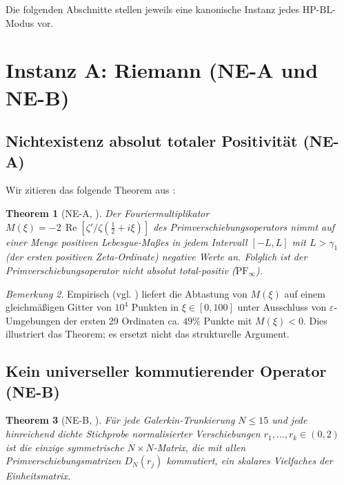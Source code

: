 \documentclass[11pt]{article}
\newtheorem{theorem}{Theorem}[section]
\theoremstyle{definition}
\theoremstyle{remark}
\newtheorem{remark}[theorem]{Bemerkung}
\newcommand{\HBL}{\mathrm{HP\text{-}BL}}
\renewcommand{\Re}{\operatorname{Re}}
\newcommand{\halfline}{\tfrac{1}{2}}
\begin{document}
Die folgenden Abschnitte stellen jeweils eine kanonische Instanz jedes
$\HBL$-Modus vor.

\section{Instanz A: Riemann (NE-A und NE-B)}
\label{sec:riemann}

\subsection{Nichtexistenz absolut totaler Positivität (NE-A)}
\label{sec:ne-a}

Wir zitieren das folgende Theorem aus \cite{Geiger2026RHII}:

\begin{theorem}[NE-A, {\cite[Thm.~NE-A]{Geiger2026RHII}}]\label{thm:NE-A}
Der Fouriermultiplikator
$M(\xi) = -2\,\Re[\zeta'/\zeta(\halfline + i\xi)]$
des Primverschiebungsoperators nimmt auf einer Menge positiven Lebesgue-Maßes
in jedem Intervall $[-L, L]$ mit $L > \gamma_1$ (der ersten positiven Zeta-Ordinate)
negative Werte an. Folglich ist der Primverschiebungsoperator
nicht absolut total-positiv ($\mathrm{PF}_\infty$).
\end{theorem}

\begin{remark}\label{rem:ne-a-empirical}
Empirisch (vgl. \cite[\S4.2]{Geiger2026RHII}) liefert die Abtastung von $M(\xi)$
auf einem gleichmäßigen Gitter von $10^4$ Punkten in $\xi \in [0,100]$ unter Ausschluss
von $\varepsilon$-Umgebungen der ersten 29 Ordinaten ca. $49\%$ Punkte mit $M(\xi) < 0$.
Dies illustriert das Theorem; es ersetzt nicht das strukturelle Argument.
\end{remark}

\subsection{Kein universeller kommutierender Operator (NE-B)}
\label{sec:ne-b}

\begin{theorem}[NE-B, {\cite[Thm.~NE-B]{Geiger2026RHII}}]\label{thm:NE-B}
Für jede Galerkin-Trunkierung $N \leq 15$ und jede hinreichend
dichte Stichprobe normalisierter Verschiebungen $r_1, \ldots, r_k \in (0,2)$
ist die einzige symmetrische $N \times N$-Matrix, die mit allen
Primverschiebungsmatrizen $D_N(r_j)$ kommutiert, ein skalares Vielfaches
der Einheitsmatrix.
\end{theorem}
\end{document}
